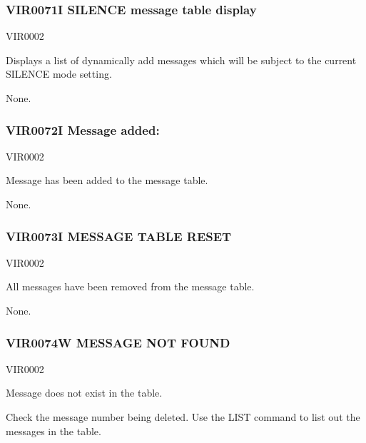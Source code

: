 \documentclass[letterpaper,10pt,english]{sphinxmanual}
\begin{document}
\subsubsection{VIR0071I SILENCE message table display}
\label{\detokenize{messages:vir0071i-silence-message-table-display}}\begin{description}
\sphinxAtStartPar
VIR0002

\sphinxAtStartPar
Displays a list of dynamically add messages which will be subject to the current SILENCE mode setting.

\sphinxAtStartPar
None.

\end{description}


\subsubsection{VIR0072I Message added: }
\label{\detokenize{messages:vir0072i-message-added-messageid}}\begin{description}
\sphinxAtStartPar
VIR0002

\sphinxAtStartPar
Message  has been added to the message table.

\sphinxAtStartPar
None.

\end{description}


\subsubsection{VIR0073I MESSAGE TABLE RESET}
\label{\detokenize{messages:vir0073i-message-table-reset}}\begin{description}
\sphinxAtStartPar
VIR0002

\sphinxAtStartPar
All messages have been removed from the message table.

\sphinxAtStartPar
None.

\end{description}


\subsubsection{VIR0074W MESSAGE NOT FOUND}
\label{\detokenize{messages:vir0074w-message-not-found}}\begin{description}
\sphinxAtStartPar
VIR0002

\sphinxAtStartPar
Message does not exist in the table.

\sphinxAtStartPar
Check the message number being deleted. Use the LIST command to list out the messages in the table.

\end{description}
\end{document}
